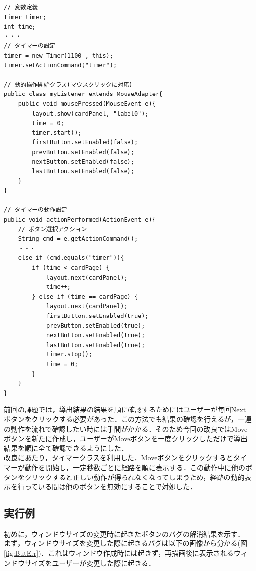 \documentclass[12pt]{jarticle}
\begin{document}
\begin{lstlisting}[caption=動的表示用,label=timer]
// 変数定義
Timer timer;
int time;
・・・
// タイマーの設定
timer = new Timer(1100 , this);
timer.setActionCommand("timer");

// 動的操作開始クラス(マウスクリックに対応)
public class myListener extends MouseAdapter{
	public void mousePressed(MouseEvent e){
		layout.show(cardPanel, "label0");
		time = 0;
		timer.start();
		firstButton.setEnabled(false);
		prevButton.setEnabled(false);
		nextButton.setEnabled(false);
		lastButton.setEnabled(false);
	}
}

// タイマーの動作設定
public void actionPerformed(ActionEvent e){
	// ボタン選択アクション
	String cmd = e.getActionCommand();
	・・・
	else if (cmd.equals("timer")){
		if (time < cardPage) {
			layout.next(cardPanel);
			time++;
		} else if (time == cardPage) {
			layout.next(cardPanel);
			firstButton.setEnabled(true);
			prevButton.setEnabled(true);
			nextButton.setEnabled(true);
			lastButton.setEnabled(true);
			timer.stop();
			time = 0;
		}
	}
}
\end{lstlisting}

前回の課題では，導出結果の結果を順に確認するためにはユーザーが毎回Nextボタンをクリックする必要があった．この方法でも結果の確認を行えるが，一連の動作を流れで確認したい時には手間がかかる．そのため今回の改良ではMoveボタンを新たに作成し，ユーザーがMoveボタンを一度クリックしただけで導出結果を順に全て確認できるようにした．\\

改良にあたり，タイマークラスを利用した．Moveボタンをクリックするとタイマーが動作を開始し，一定秒数ごとに経路を順に表示する．この動作中に他のボタンをクリックすると正しい動作が得られなくなってしまうため，経路の動的表示を行っている間は他のボタンを無効にすることで対処した．

\subsection{実行例}
初めに，ウィンドウサイズの変更時に起きたボタンのバグの解消結果を示す．\\
まず，ウィンドウサイズを変更した際に起きるバグは以下の画像から分かる(図\ref{fig:ButErr})．これはウィンドウ作成時には起きず，再描画後に表示されるウィンドウサイズをユーザーが変更した際に起きる．\\
\end{document}

